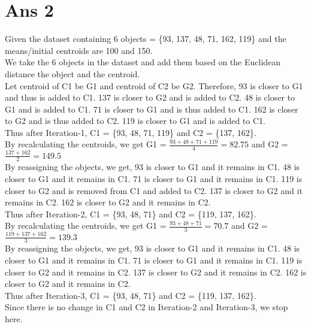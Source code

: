 \documentclass[10pt]{article}
\begin{document}
\section*{Ans 2}
\begin{flushleft}
Given the dataset containing 6 objects = \{93, 137, 48, 71, 162, 119\} and the means/initial centroids are 100 and 150.\\
We take the 6 objects in the dataset and add them based on the Euclidean distance the object and the centroid. \\
Let centroid of C1 be G1 and centroid of C2 be G2. Therefore, 93 is closer to G1 and thus is added to C1. 137 is closer to G2 and is added to C2. 48 is closer to G1 and is added to C1. 71 is closer to G1 and is thus added to C1. 162 is closer to G2 and is thus added to C2. 119 is closer to G1 and is added to C1. \\
\vspace{0.5em}
Thus after Iteration-1, C1 = \{93, 48, 71, 119\} and C2 = \{137, 162\}.\\
\vspace{1em}
By recalculating the centroids, we get G1 = $\frac{93 + 48+71+119}{4} = 82.75$ and G2 = $\frac{137+162}{2} = 149.5$\\
\vspace{0.5em}
By reassigning the objects, we get, 93 is closer to G1 and it remains in C1. 48 is closer to G1 and it remains in C1. 71 is closer to G1 and it remains in C1. 119 is closer to G2 and is removed from C1 and added to C2. 137 is closer to G2 and it remains in C2. 162 is closer to G2 and it remains in C2.\\
\vspace{0.5em}
Thus after Iteration-2, C1 = \{93, 48, 71\} and C2 = \{119, 137, 162\}.\\
\vspace{1em}
By recalculating the centroids, we get G1 = $\frac{93 + 48+71}{3} = 70.7$ and G2 = $\frac{119+137+162}{3} = 139.3$\\
\vspace{0.5em}
By reassigning the objects, we get, 93 is closer to G1 and it remains in C1. 48 is closer to G1 and it remains in C1. 71 is closer to G1 and it remains in C1. 119 is closer to G2 and it remains in C2. 137 is closer to G2 and it remains in C2. 162 is closer to G2 and it remains in C2.\\
\vspace{0.5em}
Thus after Iteration-3, C1 = \{93, 48, 71\} and C2 = \{119, 137, 162\}.\\
\vspace{0.5em}
Since there is no change in C1 and C2 in Iteration-2 and Iteration-3, we stop here.\\
\end{flushleft}
\end{document}
